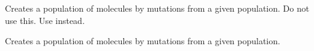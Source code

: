 \documentclass[letterpaper,10pt,english]{sphinxmanual}
\begin{document}
\begin{fulllineitems}
\label{\detokenize{api:MSTOOpt.Mutate}}
\pysigstartsignatures
\pysiglinewithargsret
{}
{\sphinxparamcomma {}}
{}
\pysigstopsignatures
\sphinxAtStartPar
Creates a population of molecules by mutations from a given population. Do not use this. Use  instead.

\end{fulllineitems}


\begin{fulllineitems}
\label{\detokenize{api:MSTOOpt.Mutate_v2}}
\pysigstartsignatures
\pysiglinewithargsret
{}
{\sphinxparamcomma {}}
{}
\pysigstopsignatures
\sphinxAtStartPar
Creates a population of molecules by mutations from a given population.

\end{fulllineitems}

\end{document}
